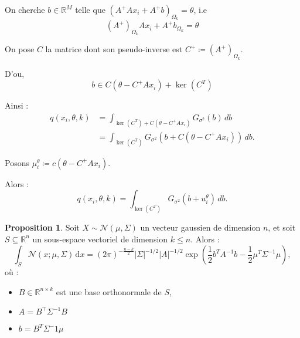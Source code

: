 \documentclass[a4paper,10pt]{article}
\theoremstyle{definition} %
\theoremstyle{definition} %
\newtheorem{proposition}[definition]{Proposition}
\theoremstyle{definition} %
\theoremstyle{definition} %
\begin{document}
On cherche $b \in \mathbb{R}^M$ telle que $(A^+A x_i + A^+b)_{\Omega_k} = \theta$, i.e
\begin{equation*}
(A^+)_{\Omega_k} A x_i + A^+ b_{\Omega_k} = \theta    
\end{equation*}


On pose $C$ la matrice dont son pseudo-inverse est $C^+ \coloneqq (A^+)_{\Omega_k}$.

D'ou,
\begin{equation*}
    b \in C (\theta - C^+ A x_i) + \ker(C^T)
\end{equation*}


Ainsi :
\begin{align*}
    q(x_i, \theta, k) &= \int_{\ker(C^T) + C(\theta - C^+ A x_i)} G_{\sigma^2}(b) \, db \\
    &= \int_{\ker(C^T)} G_{\sigma^2}(b + C(\theta - C^+ A x_i)) \, db.
\end{align*}


Posons $ \mu_i^\theta \coloneqq c(\theta - C^+ A x_i)$.

Alors :
\[
q(x_i, \theta, k) = \int_{\ker(C^T)} G_{\sigma^2}(b + u_i^\theta) \, db.
\]

\begin{proposition}\label{prop:integral_gaussien_sousespace}
Soit \( X \sim \mathcal{N}(\mu, \Sigma) \) un vecteur gaussien de dimension \( n \), et soit \( S \subseteq \mathbb{R}^n \) un sous-espace vectoriel de dimension \( k \leq n \). Alors :
\[
\int_S \mathcal{N}(x; \mu, \Sigma) \, \mathrm{d}x = (2\pi)^{-\frac{n - k}{2}} |\Sigma|^{-1/2} |A|^{-1/2} \exp\left(\frac{1}{2} b^TA^{-1}b - \frac{1}{2}\mu^T \Sigma^{-1}\mu\right) ,
\]
où :
\begin{itemize}
    \item \( B \in \mathbb{R}^{n \times k} \) est une base orthonormale de \( S \),
    \item \( A = B^\top \Sigma^{-1} B \)
    \item  $b = B^T \Sigma^-1 \mu$
\end{itemize}
\end{proposition}
\end{document}
